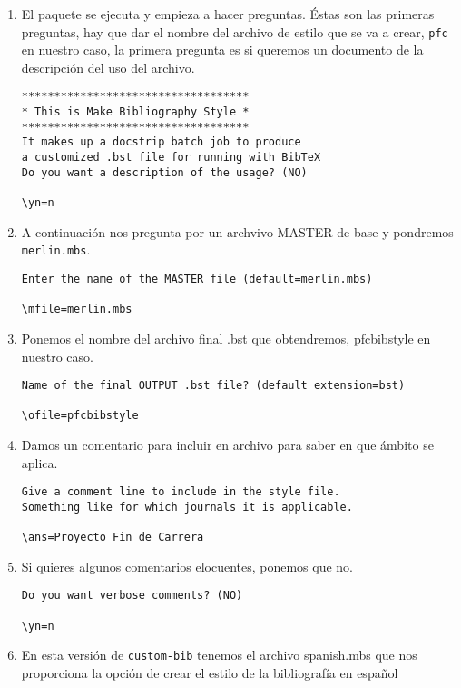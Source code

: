 \begin{enumerate}

\item El paquete se ejecuta y empieza a hacer preguntas. Éstas son las primeras preguntas, hay que dar el nombre del archivo de estilo que se va a crear, \verb|pfc| en nuestro caso, la primera pregunta es si queremos un documento de la descripción del uso  del archivo.

\begin{verbatim}
***********************************
* This is Make Bibliography Style *
***********************************
It makes up a docstrip batch job to produce
a customized .bst file for running with BibTeX
Do you want a description of the usage? (NO)

\yn=n
\end{verbatim}

\item A continuación nos pregunta por un archvivo MASTER de base y pondremos \verb|merlin.mbs|.

\begin{verbatim}
Enter the name of the MASTER file (default=merlin.mbs)

\mfile=merlin.mbs
\end{verbatim}

\item Ponemos el nombre del archivo final .bst que obtendremos, pfcbibstyle en nuestro caso.
 
\begin{verbatim}
Name of the final OUTPUT .bst file? (default extension=bst)

\ofile=pfcbibstyle
\end{verbatim}

\item Damos un comentario para incluir en archivo para saber en que ámbito se aplica.
\begin{verbatim}
Give a comment line to include in the style file.
Something like for which journals it is applicable.

\ans=Proyecto Fin de Carrera
\end{verbatim}

\item Si quieres algunos comentarios elocuentes, ponemos que no.
\begin{verbatim}
Do you want verbose comments? (NO)

\yn=n
\end{verbatim}

\item En esta versión de \verb|custom-bib| tenemos el archivo spanish.mbs que nos proporciona la opción de crear el estilo de la bibliografía en español


\end{enumerate}
